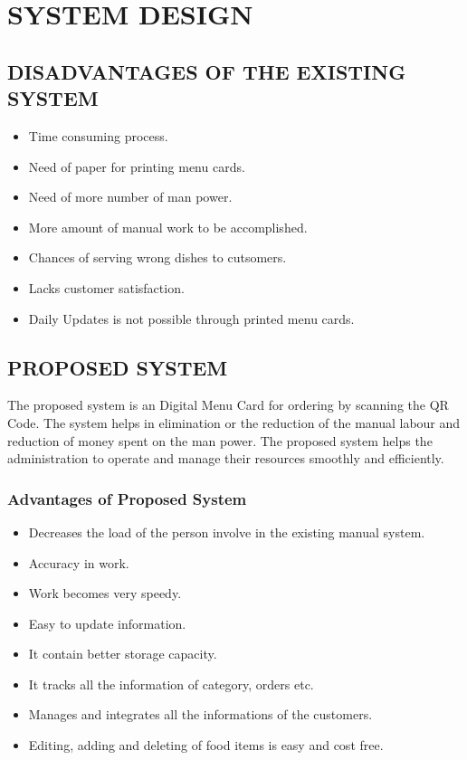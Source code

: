 \documentclass[12pt,a4paper]{report}
\begin{document}
\chapter{SYSTEM DESIGN}
\section{DISADVANTAGES OF THE EXISTING SYSTEM}
\begin{itemize}
	\item Time consuming process.
	\item Need of paper for printing menu cards.
	\item Need of more number of man power.
	\item More amount of manual work to be accomplished.
	\item Chances of serving wrong dishes to cutsomers.
	\item Lacks customer satisfaction.
	\item Daily Updates is not possible through printed menu cards.
\end{itemize}
\section{PROPOSED SYSTEM}
\hspace{0.25cm}
\par
The proposed system is an Digital Menu Card for ordering by scanning the QR Code. The system helps in elimination or the reduction of the manual labour and reduction of money spent on the man power. The proposed system helps the administration to operate and manage their resources smoothly and efficiently.
\subsection{Advantages of Proposed System}
\begin{itemize}
	\item Decreases the load of the person involve in the existing manual system.
	\item Accuracy in work.
	\item Work becomes very speedy.
	\item Easy to update information.
	\item It contain better storage capacity.
	\item It tracks all the information of category, orders etc.
	\item Manages and integrates all the informations of the customers.
	\item Editing, adding and deleting of food items is easy and cost free.
\end{itemize}
\end{document}
